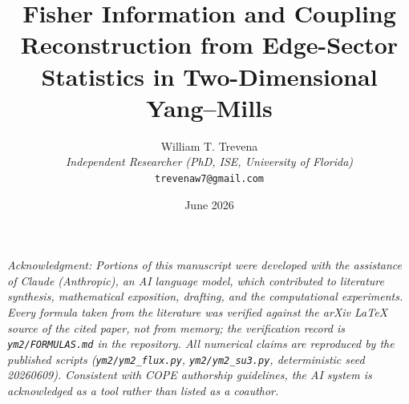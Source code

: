 \documentclass[11pt]{article}
\title{Fisher Information and Coupling Reconstruction from Edge-Sector Statistics in Two-Dimensional Yang--Mills}
\author{William T. Trevena\\[3pt]
{\small\itshape Independent Researcher (PhD, ISE, University of Florida)}\\
{\small\texttt{trevenaw7@gmail.com}}}
\date{June 2026}
\theoremstyle{remark}
\theoremstyle{plain}
\begin{document}
\maketitle

{\small\itshape Acknowledgment: Portions of this manuscript were developed with the assistance of Claude (Anthropic), an AI language model, which contributed to literature synthesis, mathematical exposition, drafting, and the computational experiments. Every formula taken from the literature was verified against the arXiv LaTeX source of the cited paper, not from memory; the verification record is \texttt{ym2/FORMULAS.md} in the repository. All numerical claims are reproduced by the published scripts (\texttt{ym2/ym2\_flux.py}, \texttt{ym2/ym2\_su3.py}, deterministic seed 20260609). Consistent with COPE authorship guidelines, the AI system is acknowledged as a tool rather than listed as a coauthor.}
\end{document}
